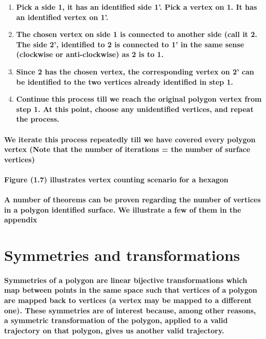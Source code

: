 \documentclass{report}
\begin{document}
\begin{enumerate}

\item \textbf{Pick a side 1, it has an identified side 1’. Pick a vertex on 1. It has an identified vertex on 1’.}

\item \textbf{The chosen vertex on side 1 is connected to another side (call it 2. The side 2’, identified to 2 is connected to 1’ in the same sense (clockwise or anti-clockwise) as 2 is to 1.}

\item \textbf{Since 2 has the chosen vertex, the corresponding vertex on 2’ can be identified to the two vertices already identified in step 1.}

\item \textbf{Continue this process till we reach the original polygon vertex from step 1. At this point, choose any unidentified vertices, and repeat the process.}

\end{enumerate}


\paragraph{We iterate this process repeatedly till we have covered every polygon vertex (Note that the number of iterations = the number of surface vertices)}

\paragraph{Figure (1.7) illustrates vertex counting scenario for a hexagon}


\paragraph{A number of theorems can be proven regarding the number of vertices in a polygon identified surface. We illustrate a few of them in the appendix}


\section{Symmetries and transformations}

\paragraph{Symmetries of a polygon are linear bijective transformations which map between points in the same space such that vertices of a polygon are mapped back to vertices (a vertex may be mapped to a different one). 
These symmetries are of interest because, among other reasons, a symmetric transformation of the polygon, applied to a valid trajectory on that polygon, gives us another valid trajectory.}
\end{document}
